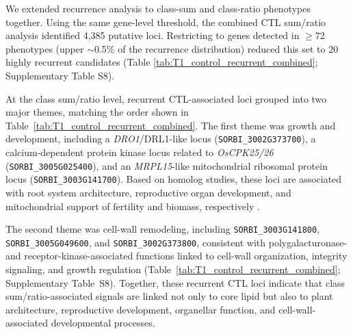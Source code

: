 \documentclass[9pt,twocolumn,twoside]{rilabRxiv}
\begin{document}
We extended recurrence analysis to class-sum and class-ratio phenotypes together. Using the same gene-level threshold, the combined CTL sum/ratio analysis identified 4,385 putative loci. Restricting to genes detected in $\geq 72$ phenotypes (upper $\sim$0.5\% of the recurrence distribution) reduced this set to 20 highly recurrent candidates (Table \ref{tab:T1_control_recurrent_combined}; Supplementary Table S8).


At the class sum/ratio level, recurrent CTL-associated loci grouped into two major themes, matching the order shown in Table~\ref{tab:T1_control_recurrent_combined}. The first theme was growth and development, including a \textit{DRO1}/DRL1-like locus (\texttt{SORBI\_3002G373700}), a calcium-dependent protein kinase locus related to \textit{OsCPK25/26} (\texttt{SORBI\_3005G025400}), and an \textit{MRPL15}-like mitochondrial ribosomal protein locus (\texttt{SORBI\_3003G141700}). Based on homolog studies, these loci are associated with root system architecture, reproductive organ development, and mitochondrial support of fertility and biomass, respectively \citep{Kitomi2020,Zhang2014,Xie2023}. 

The second theme was cell-wall remodeling, including \texttt{SORBI\_3003G141800}, \texttt{SORBI\_3005G049600}, and \texttt{SORBI\_3002G373800}, consistent with polygalacturonase- and receptor-kinase-associated functions linked to cell-wall organization, integrity signaling, and growth regulation (Table~\ref{tab:T1_control_recurrent_combined}; Supplementary Table~S8). Together, these recurrent CTL loci indicate that class sum/ratio-associated signals are linked not only to core lipid  but also to plant architecture, reproductive development, organellar function, and cell-wall-associated developmental processes.
\end{document}
